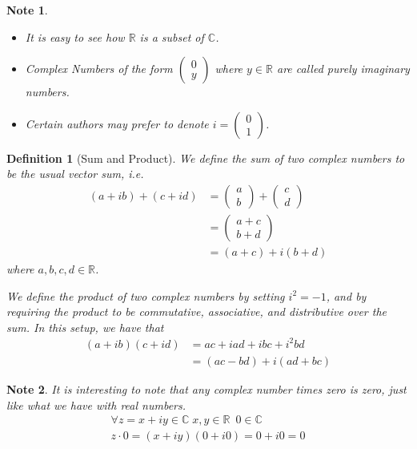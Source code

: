 \documentclass[11pt, oneside]{book}
\theoremstyle{break}
\newtheorem*{note}{Note}
\newtheorem{defn}{Definition}[section]
\begin{document}
\begin{note}
	\begin{itemize}
		\item It is easy to see how $\mathbb{R}$ is a subset of $\mathbb{C}$.
		\item Complex Numbers of the form $\left(\begin{smallmatrix} 0 \\ y \end{smallmatrix}\right)$ where $y \in \mathbb{R}$ are called \textit{purely imaginary numbers}.
		\item Certain authors may prefer to denote $i = \left(\begin{smallmatrix} 0 \\ 1 \end{smallmatrix}\right)$.
	\end{itemize}
\end{note}

\begin{defn}[Sum and Product]\label{defn:Sum and Product}
	We define the sum of two complex numbers to be the usual vector sum, i.e.
	\begin{align*}
		(a + ib) + (c + id) &= \begin{pmatrix} a \\ b \end{pmatrix} + \begin{pmatrix} c \\ d \end{pmatrix} \\
											&= \begin{pmatrix} a + c \\ b + d \end{pmatrix} \\
											&= (a + c) + i (b + d)
	\end{align*}
	where $a, b, c, d \in \mathbb{R}$.

	We define the product of two complex numbers by setting $i^2 = -1$, and by requiring the product to be commutative, associative, and distributive over the sum. In this setup, we have that
	\begin{align}
		(a + ib)(c + id) &= ac + iad + ibc + i^2 bd \nonumber \\
						 &= (ac - bd) + i (ad + bc) \label{eq:complex multiplication}
	\end{align}
\end{defn}

\begin{note}
 It is interesting to note that \textit{any complex number times zero is zero}, just like what we have with real numbers.
 \begin{gather*}
 	\forall z = x + iy \in \mathbb{C} \; x, y \in \mathbb{R} \enspace 0 \in \mathbb{C} \\
 	z \cdot 0 = (x + iy)(0 + i0) = 0 + i0 = 0
 \end{gather*}
\end{note}
\end{document}
